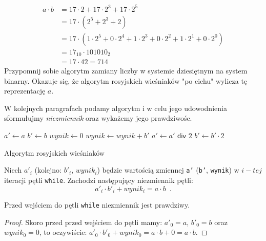 \begin{equation*} 
\begin{split}
a \cdot b &= 17\cdot2 + 17\cdot2^3 + 17\cdot2^5 \\
&= 17 \cdot ( 2^5 + 2^3 + 2) \\
&= 17 \cdot ( 1 \cdot 2^5 + 0 \cdot 2^4 + 1 \cdot 2^3 + 0 \cdot 2^2 + 1 \cdot 2^1 + 0 \cdot 2^0 ) \\
&=17_{10} \cdot 101010_2 \\
&=17 \cdot 42 = 714
\end{split}
\end{equation*}
Przypomnij sobie algorytm zamiany liczby w systemie dziesiętnym na system binarny.
Okazuje się, że algorytm rosyjskich wieśniaków "po cichu" wylicza tę reprezentację $a$.

W kolejnych paragrafach podamy algorytm i w celu jego udowodnienia sformułujmy \textit{niezmiennik} oraz wykażemy jego prawdziwośc.

\begin{algorithm}[h]
  \DontPrintSemicolon
  
  
  
  $a' \leftarrow a$\;
  $b' \leftarrow b$\;
  $wynik \leftarrow 0$\;
  {
    {
      $wynik \leftarrow wynik + b'$\;
    }
    $a' \leftarrow a' \textsf{ div } 2$\;
    $b' \leftarrow b' \cdot 2$\;
  }
  
  \caption{Algorytm rosyjskich wieśniaków}
  \label{alg-wiesniakow}
\end{algorithm}

\begin{theorem}
Niech $a'_i$ (kolejno: $b'_i$, $wynik_i$) będzie wartością zmiennej \texttt{a'} (\texttt{b'}, \texttt{wynik}) w $i-tej$ iteracji pętli \texttt{while}. Zachodzi następujący niezmiennik pętli:
\[
a'_i \cdot b'_i + wynik_i = a \cdot b \enspace.
\]
\end{theorem}

\begin{lemma}
Przed wejściem do pętli \texttt{while} niezmiennik jest prawdziwy.
\end{lemma}
\begin{proof}
Skoro przed przed wejściem do pętli mamy: $a'_0 = a$, $b'_0 = b$ oraz $wynik_0 = 0$, to oczywiście: $a'_0 \cdot b'_0 + wynik_0 = a \cdot b + 0 = a \cdot b$.
\end{proof}

